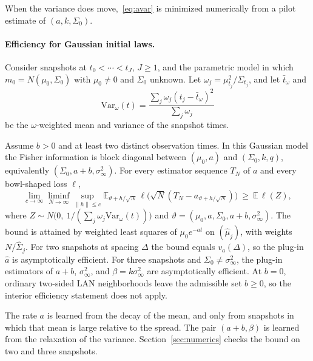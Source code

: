 \documentclass[anon,11pt]{alt2027}
\newcommand{\Var}{\mathrm{Var}}
\begin{document}
When the variance does move,~\eqref{eq:avar} is minimized numerically from a
pilot estimate of $(a,k,\Sigma_0)$.

\paragraph{Efficiency for Gaussian initial laws.}
Consider snapshots at $t_0<\cdots<t_J$, $J\ge 1$, and the parametric model in
which $m_0=N(\mu_0,\Sigma_0)$ with $\mu_0\neq 0$ and $\Sigma_0$ unknown.
Let $\omega_j=\mu_{t_j}^2/\Sigma_{t_j}$, and let $\bar t_\omega$ and
\[
\Var_\omega(t)
=
\frac{\sum_j\omega_j(t_j-\bar t_\omega)^2}{\sum_j\omega_j}
\]
be the $\omega$-weighted mean and variance of the snapshot times.

\begin{theorem}
\label{thm:lam}
Assume $b>0$ and at least two distinct observation times. In this Gaussian
model the Fisher information is block diagonal between
$(\mu_0,a)$ and $(\Sigma_0,k,q)$, equivalently
$(\Sigma_0,a+b,\sigma_\infty^2)$. For every estimator sequence
$T_N$ of $a$ and every bowl-shaped loss $\ell$,
\[
\lim_{c\to\infty}
\liminf_{N\to\infty}
\sup_{\|h\|\le c}
\mathbb E_{\vartheta+h/\sqrt N}
\,\ell\bigl(\sqrt N(T_N-a_{\vartheta+h/\sqrt N})\bigr)
\ \ge\
\mathbb E\,\ell(Z),
\]
where $Z\sim N\bigl(0,\ 1/(\sum_j\omega_j\Var_\omega(t))\bigr)$ and
$\vartheta=(\mu_0,a,\Sigma_0,a+b,\sigma_\infty^2)$.
The bound is attained by weighted least squares of $\mu_0 e^{-at}$ on
$(\hat\mu_j)$, with weights $N/\hat\Sigma_j$. For two snapshots at spacing
$\Delta$ the bound equals $v_a(\Delta)$, so the plug-in $\hat a$ is
asymptotically efficient. For three snapshots and $\Sigma_0\neq\sigma_\infty^2$,
the plug-in estimators of $a+b$, $\sigma_\infty^2$, and $\beta=k\sigma_\infty^2$
are asymptotically efficient.
At $b=0$, ordinary two-sided LAN neighborhoods leave the admissible set
$b\ge 0$, so the interior efficiency statement does not apply.
\end{theorem}

The rate $a$ is learned from the decay of the mean, and only from snapshots in
which that mean is large relative to the spread. The pair $(a+b,\beta)$ is
learned from the relaxation of the variance. Section~\ref{sec:numerics} checks
the bound on two and three snapshots.
\end{document}
